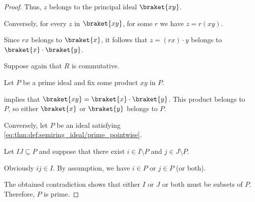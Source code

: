 \begin{proof}
  Thus, \( z \) belongs to the principal ideal \( \braket{ xy } \).

  \NecessitySubProof* Conversely, for every \( z \) in \( \braket{ xy } \), for some \( r \) we have \( z = r(xy) \).

  Since \( rx \) belongs to \( \braket{ x } \), it follows that \( z = (rx) \cdot y \) belongs to \( \braket{ x } \cdot \braket{ y } \).

   Suppose again that \( R \) is commutative.

  \SufficiencySubProof* Let \( P \) be a prime ideal and fix some product \( xy \) in \( P \).

   implies that \( \braket{ xy } = \braket{ x } \cdot \braket{ y } \). This product belongs to \( P \), so either \( \braket{ x } \) or \( \braket{ y } \) belongs to \( P \).

  \NecessitySubProof* Conversely, let \( P \) be an ideal satisfying \eqref{eq:thm:def:semiring_ideal/prime_pointwise}.

  Let \( IJ \subseteq P \) and suppose that there exist \( i \in I \setminus P \) and \( j \in J \setminus P \).

  Obviously \( ij \in I \). By assumption, we have \( i \in P \) or \( j \in P \) (or both).

  The obtained contradiction shows that either \( I \) or \( J \) or both must be subsets of \( P \). Therefore, \( P \) is prime.
\end{proof}

